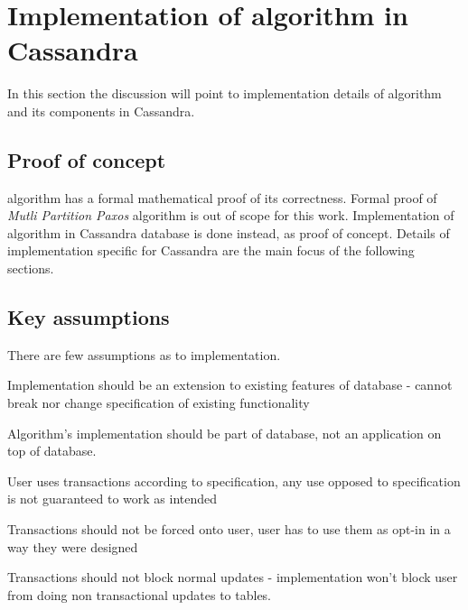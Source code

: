 
\section{Implementation of algorithm in Cassandra}\label{sec:mpp:impl}
In this section the discussion will point to implementation details of algorithm and its components in Cassandra. 


\subsection{Proof of concept}
\paxos algorithm has a formal mathematical proof of its correctness. \cite{Lamport1998partTimeParliment} Formal proof of \emph{Mutli Partition Paxos} algorithm is out of scope for this work. Implementation of algorithm in Cassandra database is done instead, as proof of concept. Details of implementation specific for Cassandra are the main focus of the following sections.




\subsection{Key assumptions}
There are few assumptions as to implementation.
\begin{enumerate*}
\item  Implementation should be an extension to existing features of database - cannot break nor change specification of existing functionality
\item Algorithm’s implementation should be part of database, not an application on top of database.
\item User uses transactions according to specification, any use opposed to specification is not guaranteed to work as intended
\item Transactions should not be forced onto user, user has to use them as opt-in in a way they were designed
\item Transactions should not block normal updates - implementation won’t block user from doing non transactional updates to tables.
\end{enumerate*}


